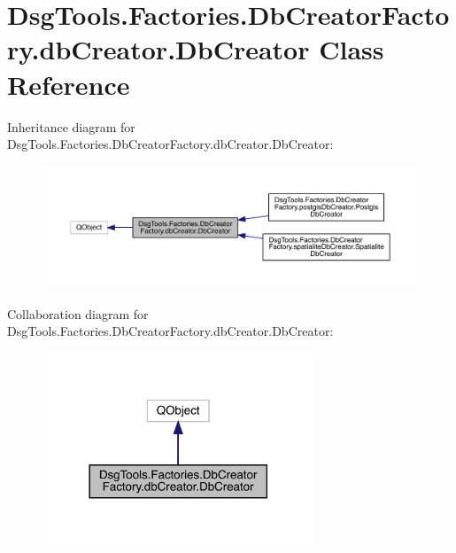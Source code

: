 \hypertarget{class_dsg_tools_1_1_factories_1_1_db_creator_factory_1_1db_creator_1_1_db_creator}{}\section{Dsg\+Tools.\+Factories.\+Db\+Creator\+Factory.\+db\+Creator.\+Db\+Creator Class Reference}
\label{class_dsg_tools_1_1_factories_1_1_db_creator_factory_1_1db_creator_1_1_db_creator}


Inheritance diagram for Dsg\+Tools.\+Factories.\+Db\+Creator\+Factory.\+db\+Creator.\+Db\+Creator\+:
\nopagebreak
\begin{figure}[H]
\begin{center}
\leavevmode
\includegraphics[width=350pt]{class_dsg_tools_1_1_factories_1_1_db_creator_factory_1_1db_creator_1_1_db_creator__inherit__graph}
\end{center}
\end{figure}


Collaboration diagram for Dsg\+Tools.\+Factories.\+Db\+Creator\+Factory.\+db\+Creator.\+Db\+Creator\+:
\nopagebreak
\begin{figure}[H]
\begin{center}
\leavevmode
\includegraphics[width=230pt]{class_dsg_tools_1_1_factories_1_1_db_creator_factory_1_1db_creator_1_1_db_creator__coll__graph}
\end{center}
\end{figure}
